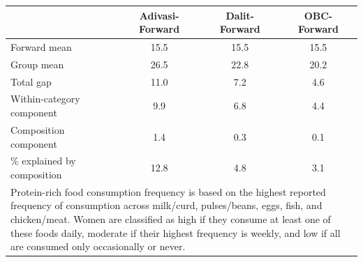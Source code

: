 \begin{tabular}{l*{3}{c}}
\hline\hline
            &\multicolumn{1}{c}{Adivasi-Forward}&\multicolumn{1}{c}{Dalit-Forward}&\multicolumn{1}{c}{OBC-Forward}\\
\hline
\hline
Forward mean&        15.5&        15.5&        15.5\\
Group mean  &        26.5&        22.8&        20.2\\
Total gap   &        11.0&         7.2&         4.6\\
Within-category component&         9.9&         6.8&         4.4\\
Composition component&         1.4&         0.3&         0.1\\
\% explained by composition&        12.8&         4.8&         3.1\\
\hline\hline
\multicolumn{4}{l}{\footnotesize \parbox[t]{0.95\linewidth}{Protein-rich food consumption frequency is based on the highest reported frequency of consumption across milk/curd, pulses/beans, eggs, fish, and chicken/meat. Women are classified as high if they consume at least one of these foods daily, moderate if their highest frequency is weekly, and low if all are consumed only occasionally or never.}}\\
\end{tabular}
